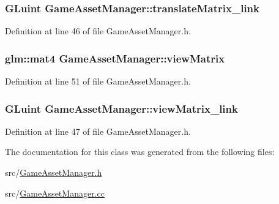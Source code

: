 \subsubsection[{translate\+Matrix\+\_\+link}]{\setlength{\rightskip}{0pt plus 5cm}G\+Luint Game\+Asset\+Manager\+::translate\+Matrix\+\_\+link\hspace{0.3cm}{\ttfamily [private]}}\label{class_game_asset_manager_a5e737710573e276ca53c683bc6731a51}


Definition at line 46 of file Game\+Asset\+Manager.\+h.

\hypertarget{class_game_asset_manager_a4e702908c5d7d66e40c676d2c4f7930c}{}
\subsubsection[{view\+Matrix}]{\setlength{\rightskip}{0pt plus 5cm}glm\+::mat4 Game\+Asset\+Manager\+::view\+Matrix\hspace{0.3cm}{\ttfamily [private]}}\label{class_game_asset_manager_a4e702908c5d7d66e40c676d2c4f7930c}


Definition at line 51 of file Game\+Asset\+Manager.\+h.

\hypertarget{class_game_asset_manager_a71322a65c085d1d296e87aaddc4aea15}{}
\subsubsection[{view\+Matrix\+\_\+link}]{\setlength{\rightskip}{0pt plus 5cm}G\+Luint Game\+Asset\+Manager\+::view\+Matrix\+\_\+link\hspace{0.3cm}{\ttfamily [private]}}\label{class_game_asset_manager_a71322a65c085d1d296e87aaddc4aea15}


Definition at line 47 of file Game\+Asset\+Manager.\+h.



The documentation for this class was generated from the following files\+:\begin{DoxyCompactItemize}
\item 
src/\hyperlink{_game_asset_manager_8h}{Game\+Asset\+Manager.\+h}\item 
src/\hyperlink{_game_asset_manager_8cc}{Game\+Asset\+Manager.\+cc}\end{DoxyCompactItemize}
